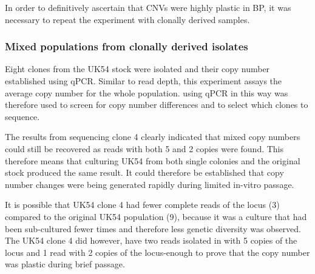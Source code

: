 \documentclass{article}
\begin{document}
In order to definitively ascertain that CNVs were highly plastic in BP, it was necessary to repeat the experiment with clonally derived samples.



\subsubsection{Mixed populations from clonally derived isolates}


Eight clones from the UK54 stock were isolated and their copy number established using qPCR. Similar to read depth, this experiment assays the average copy number for the whole population. using qPCR in this way was therefore used to screen for copy number differences and to select which clones to sequence. 

The results from sequencing clone 4 clearly indicated that mixed copy numbers could still be recovered as reads with both 5 and 2 copies were found. This therefore means that culturing UK54 from both single colonies and the original stock produced the same result. It could therefore be established that copy number changes were being generated rapidly during limited in-vitro passage. 




It is possible that UK54 clone 4 had fewer complete reads of the locus (3) compared to the original UK54 population (9), because it was a culture that had been sub-cultured fewer times and therefore less genetic diversity was observed. The UK54 clone 4 did  however, have two reads isolated in with 5 copies of the locus and 1 read with 2 copies of the locus-enough to prove that the copy number was plastic during brief passage. 
\end{document}
